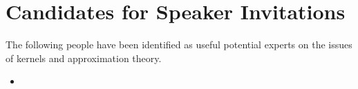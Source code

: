 \section{Candidates for Speaker Invitations}
The following people have been identified as useful potential experts on the issues of kernels and approximation theory.
\begin{itemize}
 \item 
\end{itemize}
